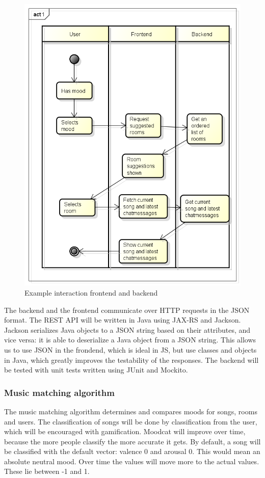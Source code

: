\begin{figure}[H]
\includegraphics[scale=.4]{backendInteraction.png}
\caption{Example interaction frontend and backend}
\label{fig: backendInteraction}
\end{figure}


\par
The backend and the frontend communicate over \Gls{HTTP} requests in the \Gls{JSON} format.
The REST API will be written in Java using JAX-RS and Jackson.
Jackson serializes Java objects to a JSON string based on their attributes, and vice versa: it is able to deserialize a Java object from a JSON string.
This allows us to use JSON in the frondend, which is ideal in \Gls{JS}, but use classes and objects in Java, which greatly improves the testability of the responses.
The backend will be tested with unit tests written using JUnit and Mockito.

\subsubsection{Music matching algorithm}\label{MatchingAlgorithm}
The music matching algorithm determines and compares moods for songs, rooms and users.
The classification of songs will be done by classification from the user, which will be encouraged with gamification.
Moodcat will improve over time, because the more people classify the more accurate it gets.
By default, a song will be classified with the default vector: valence 0 and arousal 0. This would mean an absolute neutral mood. Over time the values will move more to the actual values. These lie between -1 and 1.

